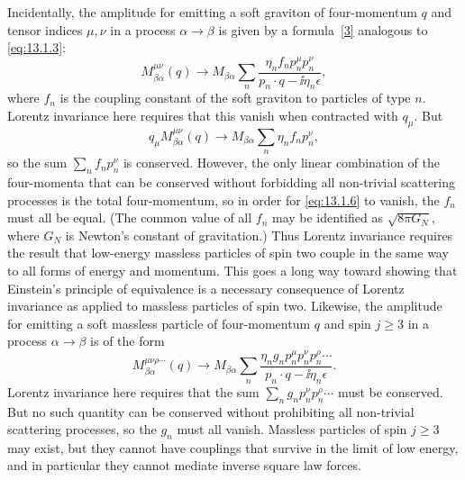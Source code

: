 Incidentally, the amplitude for emitting a soft graviton of four-momentum
$q$ and tensor indices $\mu,\nu$ in a process $\alpha\to\beta$ is given by a
formula~\hyperref[ref:13.3]{[3]} analogous to \eqref{eq:13.1.3}:
\begin{equation}
  M^{\mu\nu}_{\beta\alpha}(q)\longrightarrow
  M_{\beta\alpha}\sum_n\frac{\eta_n f_n p_n^\mu p_n^\nu}{p_n\cdot q-\ii\eta_n\epsilon},
  \tag{13.1.5}\label{eq:13.1.5}
\end{equation}
where $f_n$ is the coupling constant of the soft graviton to particles of type
$n$. Lorentz invariance here requires that this vanish when contracted with
$q_\mu$. But
\begin{equation}
  q_\mu M^{\mu\nu}_{\beta\alpha}(q)\longrightarrow
  M_{\beta\alpha}\sum_n\eta_n f_n p_n^\nu,
  \tag{13.1.6}\label{eq:13.1.6}
\end{equation}
so the sum $\sum_n f_n p_n^\nu$ is conserved. However, the only linear combination
of the four-momenta that can be conserved without forbidding all
non-trivial scattering processes is the total four-momentum, so in order for
\eqref{eq:13.1.6} to vanish, the $f_n$ must all be equal. (The common value of
all $f_n$ may be identified as $\sqrt{8\pi G_N}$, where $G_N$ is Newton's constant of
gravitation.) Thus Lorentz invariance requires the result that low-energy
massless particles of spin two couple in the same way to all forms of energy
and momentum. This goes a long way toward showing that Einstein's
principle of equivalence is a necessary consequence of Lorentz invariance
as applied to massless particles of spin two. Likewise, the amplitude for
emitting a soft massless particle of four-momentum $q$ and spin $j\geq3$ in a
process $\alpha\to\beta$ is of the form
\[
  M^{\mu\nu\rho\cdots}_{\beta\alpha}(q)\longrightarrow
  M_{\beta\alpha}\sum_n
  \frac{\eta_n g_n p_n^\mu p_n^\nu p_n^\rho\cdots}{p_n\cdot q-\ii\eta_n\epsilon}.
\]
Lorentz invariance here requires that the sum $\sum_n g_n p_n^\nu p_n^\rho\cdots$ must be
conserved. But no such quantity can be conserved without prohibiting all
non-trivial scattering processes, so the $g_n$ must all vanish. Massless
particles of spin $j\geq3$ may exist, but they cannot have couplings that survive
in the limit of low energy, and in particular they cannot mediate inverse
square law forces.

